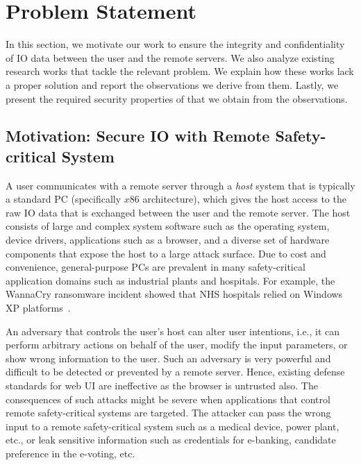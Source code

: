 \section{Problem Statement}
\label{sec:problemStatementProtection}

In this section, we motivate our work to ensure the integrity and confidentiality of IO data between the user and the remote servers. We also analyze existing research works that tackle the relevant problem. We explain how these works lack a proper solution and report the observations we derive from them. Lastly, we present the required security properties of \name that we obtain from the observations.

\subsection{Motivation: Secure IO with Remote Safety-critical System}

A user communicates with a remote server through a \emph{host} system that is typically a standard PC (specifically $x86$ architecture), which gives the host access to the raw IO data that is exchanged between the user and the remote server. The host consists of large and complex system software such as the operating system, device drivers, applications such as a browser, and a diverse set of hardware components that expose the host to a large attack surface. Due to cost and convenience, general-purpose PCs are prevalent in many safety-critical application domains such as industrial plants and hospitals. For example, the WannaCry ransomware incident showed that NHS hospitals relied on Windows XP platforms~\cite{berry_2017,field_wannacry_2018}. 

An adversary that controls the user's host can alter user intentions, i.e., it can perform arbitrary actions on behalf of the user, modify the input parameters, or show wrong information to the user. Such an adversary is very powerful and difficult to be detected or prevented by a remote server. Hence, existing defense standards for web UI are ineffective as the browser is untrusted also. The consequences of such attacks might be severe when applications that control remote safety-critical systems are targeted. 
The attacker can pass the wrong input to a remote safety-critical system such as a medical device, power plant, etc., or leak sensitive information such as credentials for e-banking, candidate preference in the e-voting, etc.




